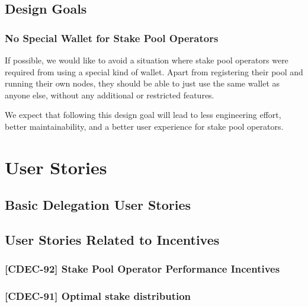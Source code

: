 \documentclass[11pt,a4paper]{article}
\begin{document}
\subsection{Design Goals}\label{design-goals}

\subsubsection{No Special Wallet for Stake Pool
Operators}\label{no-special-wallet-for-stake-pool-operators}

If possible, we would like to avoid a situation where stake pool
operators were required from using a special kind of wallet. Apart from
registering their pool and running their own nodes, they should be able
to just use the same wallet as anyone else, without any additional or
restricted features.

We expect that following this design goal will lead to less engineering
effort, better maintainability, and a better user experience for stake
pool operators.

\section{User Stories}\label{user-stories}

\subsection{Basic Delegation User
Stories}\label{basic-delegation-user-stories}


\subsection{User Stories Related to
Incentives}\label{user-stories-related-to-incentives}

\subsubsection{{[}CDEC-92{]} Stake Pool Operator Performance
Incentives}\label{cdec-92-stake-pool-operator-performance-incentives}

\subsubsection{{[}CDEC-91{]} Optimal stake
distribution}\label{cdec-91-optimal-stake-distribution}
\end{document}
